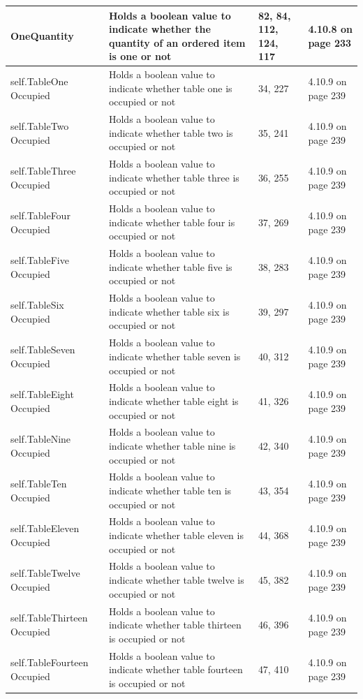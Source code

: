 \begin{center}
\begin{longtable}{|p{3cm}|p{4.5cm}|p{3cm}|p{1cm}|}
OneQuantity & Holds a boolean value to indicate whether the quantity of an ordered item is one or not &82, 84, 112, 124, 117 & 4.10.8 on page 233\\ \hline
self.TableOne Occupied & Holds a boolean value to indicate whether table one is occupied or not &34, 227 &4.10.9 on page 239 \\ \hline
 self.TableTwo Occupied &Holds a boolean value to indicate whether table two is occupied or not &35, 241 & 4.10.9 on page 239\\ \hline
self.TableThree Occupied &Holds a boolean value to indicate whether table three is occupied or not &36, 255 &4.10.9  on page 239\\ \hline
 self.TableFour Occupied&Holds a boolean value to indicate whether table four is occupied or not &37, 269  & 4.10.9 on page 239\\ \hline
     self.TableFive Occupied &Holds a boolean value to indicate whether table five is occupied or not &38, 283 &4.10.9 on page 239 \\ \hline
     self.TableSix Occupied &Holds a boolean value to indicate whether table six is occupied or not &39, 297 &4.10.9  on page 239\\ \hline
     self.TableSeven Occupied & Holds a boolean value to indicate whether table seven is occupied or not&40, 312  & 4.10.9 on page 239\\ \hline
     self.TableEight Occupied&Holds a boolean value to indicate whether table eight is occupied or not & 41, 326 &4.10.9  on page 239\\ \hline
     self.TableNine Occupied &Holds a boolean value to indicate whether table nine is occupied or not &42, 340  &4.10.9 on page 239 \\ \hline
     self.TableTen Occupied &Holds a boolean value to indicate whether table ten is occupied or not & 43, 354 &4.10.9 on page 239 \\ \hline
     self.TableEleven Occupied&Holds a boolean value to indicate whether table eleven is occupied or not &44, 368  &4.10.9 on page 239 \\ \hline
     self.TableTwelve Occupied &Holds a boolean value to indicate whether table twelve is occupied or not &45, 382  & 4.10.9 on page 239\\ \hline
     self.TableThirteen Occupied &Holds a boolean value to indicate whether table thirteen is occupied or not &46, 396 &4.10.9  on page 239\\ \hline
     self.TableFourteen Occupied& Holds a boolean value to indicate whether table fourteen is occupied or not&47, 410 &4.10.9  on page 239\\ \hline

\end{longtable}
\end{center}
